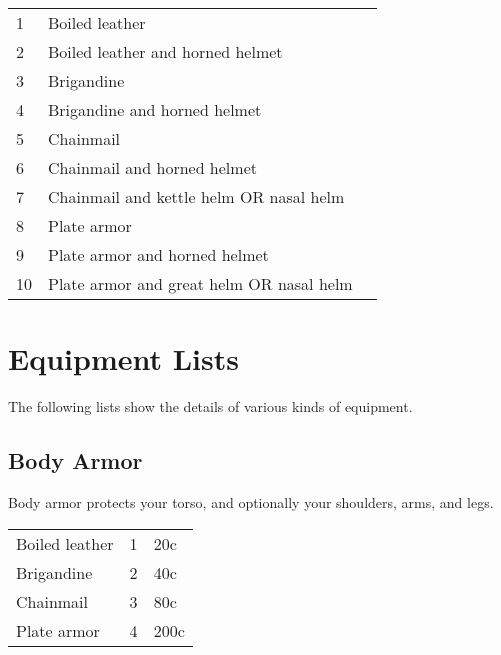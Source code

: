 \begin{center}
{
\begin{xtabular}{|l|l|l|}
1 & Boiled leather \\
2 & Boiled leather and horned helmet \\
3 & Brigandine \\
4 & Brigandine and horned helmet \\
5 & Chainmail \\
6 & Chainmail and horned helmet \\
7 & Chainmail and kettle helm OR nasal helm \\
8 & Plate armor \\
9 & Plate armor and horned helmet \\
10 & Plate armor and great helm OR nasal helm \\
\hline
\end{xtabular}
}
\end{center}

\section{Equipment Lists}

The following lists show the details of various kinds of equipment.

\subsection{Body Armor}

Body armor protects your torso, and optionally your shoulders,
arms, and legs.

\begin{center}
{
\begin{xtabular}{|l|l|l|}
Boiled leather & 1 & 20c \\
Brigandine & 2 & 40c \\
Chainmail & 3 & 80c \\
Plate armor & 4 & 200c \\
\hline
\end{xtabular}
}
\end{center}

